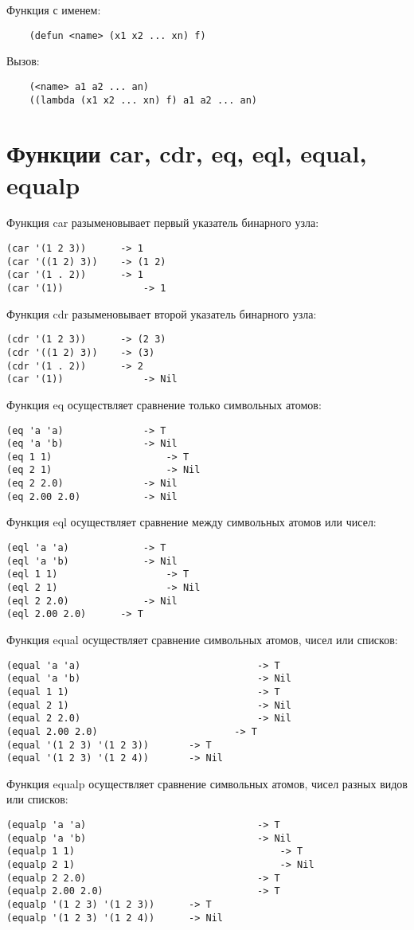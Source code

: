 Функция с именем:
\begin{lstlisting}
	(defun <name> (x1 x2 ... xn) f)
\end{lstlisting}

Вызов:
\begin{lstlisting}
	(<name> a1 a2 ... an)
	((lambda (x1 x2 ... xn) f) a1 a2 ... an)
\end{lstlisting}

\section{Функции car, cdr, eq, eql, equal, equalp}

Функция car разыменовывает первый указатель бинарного узла:
\begin{lstlisting}
(car '(1 2 3)) 		-> 1
(car '((1 2) 3)) 	-> (1 2)
(car '(1 . 2)) 		-> 1
(car '(1))				-> 1
\end{lstlisting}

Функция cdr разыменовывает второй указатель бинарного узла:
\begin{lstlisting}
(cdr '(1 2 3)) 		-> (2 3)
(cdr '((1 2) 3)) 	-> (3)
(cdr '(1 . 2)) 		-> 2
(car '(1))				-> Nil
\end{lstlisting}

Функция eq осуществляет сравнение только символьных атомов:
\begin{lstlisting}
(eq 'a 'a)				-> T
(eq 'a 'b)				-> Nil
(eq 1 1)					-> T
(eq 2 1)					-> Nil
(eq 2 2.0)				-> Nil
(eq 2.00 2.0)			-> Nil
\end{lstlisting}

Функция eql осуществляет сравнение между символьных атомов или чисел:
\begin{lstlisting}
(eql 'a 'a)				-> T
(eql 'a 'b)				-> Nil
(eql 1 1)					-> T
(eql 2 1)					-> Nil
(eql 2 2.0)				-> Nil
(eql 2.00 2.0)		-> T
\end{lstlisting}

Функция equal осуществляет сравнение символьных атомов, чисел или списков:
\begin{lstlisting}
(equal 'a 'a)								-> T
(equal 'a 'b)								-> Nil
(equal 1 1)									-> T
(equal 2 1)									-> Nil
(equal 2 2.0)								-> Nil
(equal 2.00 2.0)						-> T
(equal '(1 2 3) '(1 2 3))		-> T
(equal '(1 2 3) '(1 2 4))		-> Nil
\end{lstlisting}

Функция equalp осуществляет сравнение символьных атомов, чисел разных видов или списков:
\begin{lstlisting}
(equalp 'a 'a)								-> T
(equalp 'a 'b)								-> Nil
(equalp 1 1)									-> T
(equalp 2 1)									-> Nil
(equalp 2 2.0)								-> T
(equalp 2.00 2.0)							-> T
(equalp '(1 2 3) '(1 2 3))		-> T
(equalp '(1 2 3) '(1 2 4))		-> Nil
\end{lstlisting}

